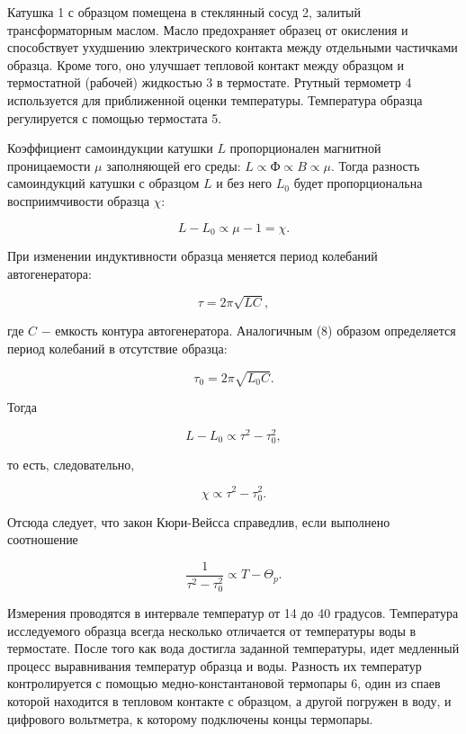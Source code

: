 \documentclass[a4paper,12pt]{article} %
\begin{document}
\hfill \break Катушка 1 с образцом помещена в стеклянный сосуд 2, залитый трансформаторным маслом. Масло предохраняет образец от окисления и способствует ухудшению электрического контакта между отдельными частичками образца. Кроме того, оно улучшает тепловой контакт между образцом и термостатной (рабочей) жидкостью 3 в термостате. Ртутный термометр 4 используется для приближенной оценки температуры. Температура образца регулируется с помощью термостата 5.

\hfill \break Коэффициент самоиндукции катушки $L$ пропорционален магнитной проницаемости $\mu$ заполняющей его среды: $L \propto \text{Ф} \propto B \propto \mu$. Тогда разность самоиндукций катушки с образцом $L$ и без него $L_{0}$ будет пропорциональна восприимчивости образца $\chi$:

$$
L-L_{0} \propto \mu - 1 = \chi.
$$

\hfill \break При изменении индуктивности образца меняется период колебаний автогенератора:

\begin{equation}\label{ linkname }
\tau = 2\pi \sqrt{LC},
\end{equation}

\hfill \break где $C$ $-$ емкость контура автогенератора. Аналогичным (8) образом определяется период колебаний в отсутствие образца:

\begin{equation}\label{ linkname }
\tau_{0} = 2\pi \sqrt{L_{0}C}.
\end{equation}

\hfill \break Тогда

$$
L-L_{0} \propto \tau^2-\tau_{0}^2,
$$

\hfill \break то есть, следовательно,

$$
\chi \propto \tau^2 - \tau_{0}^2.
$$

\hfill \break Отсюда следует, что закон Кюри-Вейсса справедлив, если выполнено соотношение

\begin{equation}\label{ linkname }
\frac{1}{\tau^2 - \tau_{0}^2} \propto T - \Theta_{p}.
\end{equation}

\hfill \break Измерения проводятся в интервале температур от 14 до 40 градусов. Температура исследуемого образца всегда несколько отличается от температуры воды в термостате. После того как вода достигла заданной температуры, идет медленный процесс выравнивания температур образца и воды. Разность их температур контролируется с помощью медно-константановой термопары 6, один из спаев которой находится в тепловом контакте с образцом, а другой погружен в воду, и цифрового вольтметра, к которому подключены концы термопары.
\end{document}
